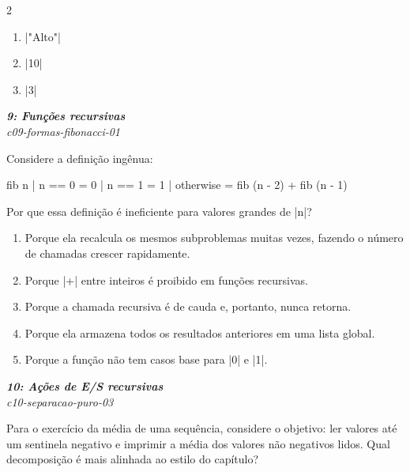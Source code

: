 \documentclass[a4paper,10pt,brazil]{article}
\begin{document}
\begin{multicols}{2}
\begin{enumerate}
  \item \haskellinline|"Alto"|

  \item \haskellinline|10|

  \item \haskellinline|3|


\end{enumerate}

\begin{flushright}
  \footnotesize
  \textit{\textbf{9: Funções recursivas}}\\
  \textit{c09-formas-fibonacci-01}\\

\end{flushright}
Considere a definição ingênua:
\begin{haskellcode}
fib n | n == 0    = 0
      | n == 1    = 1
      | otherwise = fib (n - 2) + fib (n - 1)
\end{haskellcode}
Por que essa definição é ineficiente para valores grandes de \haskellinline|n|?

\begin{enumerate}
  \item Porque ela recalcula os mesmos subproblemas muitas vezes, fazendo o número de chamadas crescer rapidamente.

  \item Porque \haskellinline|+| entre inteiros é proibido em funções recursivas.

  \item Porque a chamada recursiva é de cauda e, portanto, nunca retorna.

  \item Porque ela armazena todos os resultados anteriores em uma lista global.

  \item Porque a função não tem casos base para \haskellinline|0| e \haskellinline|1|.


\end{enumerate}

\begin{flushright}
  \footnotesize
  \textit{\textbf{10: Ações de E/S recursivas}}\\
  \textit{c10-separacao-puro-03}\\

\end{flushright}
Para o exercício da média de uma sequência, considere o objetivo: ler valores até um sentinela negativo e imprimir a média dos valores não negativos lidos. Qual decomposição é mais alinhada ao estilo do capítulo?


\end{multicols}
\end{document}
